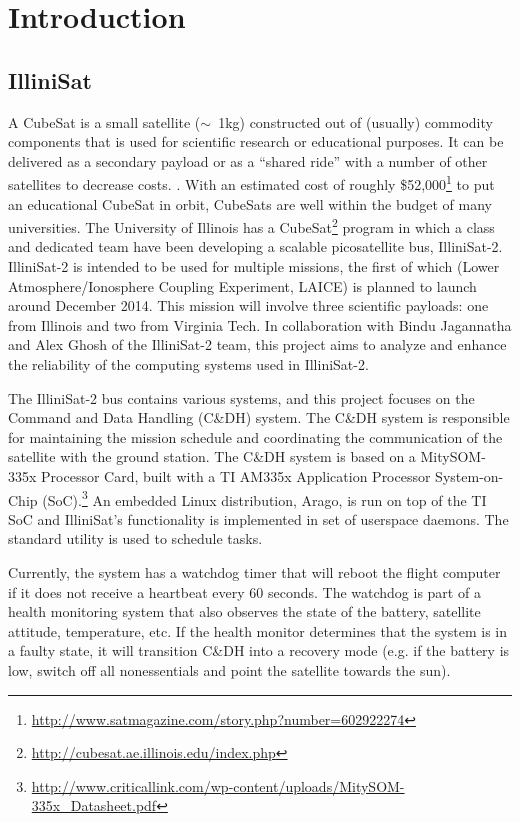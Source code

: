 \section{Introduction}
\subsection{IlliniSat}
A CubeSat is a small satellite ($\sim$~1kg) constructed out of (usually) commodity components
that is used for scientific research or educational purposes. It can be delivered as a secondary payload or 
as a ``shared ride'' with a number of other satellites to decrease costs.
\cite{toorian2008cubesat}.  
With an estimated cost of roughly
\$52,000\footnote{\url{http://www.satmagazine.com/story.php?number=602922274}}
to put an educational CubeSat in orbit, CubeSats are well within the budget of
many universities.  The University of Illinois has a
CubeSat\footnote{\url{http://cubesat.ae.illinois.edu/index.php}} program in
which a class and dedicated team have been developing a scalable picosatellite
bus, IlliniSat-2.  IlliniSat-2 is intended to be used for multiple
missions, the first of which (Lower Atmosphere/Ionosphere Coupling Experiment,
LAICE) is planned to launch around December 2014.  This mission will involve
three scientific payloads: one from Illinois and two from Virginia Tech.  In
collaboration with Bindu Jagannatha and Alex Ghosh of the IlliniSat-2 team, this
project aims to analyze and enhance the reliability of the computing systems
used in IlliniSat-2.

The IlliniSat-2 bus contains various systems, and this project focuses on the
Command and Data Handling (C\&DH) system.  The C\&DH system is responsible
for maintaining the mission schedule and coordinating the communication of the
satellite with the ground station.  The C\&DH system is based on a MitySOM-335x
Processor Card, built with a TI AM335x Application Processor System-on-Chip
(SoC).\footnote{\url{http://www.criticallink.com/wp-content/uploads/MitySOM-335x_Datasheet.pdf}}
An embedded Linux distribution, Arago, is run on top of the TI SoC and
IlliniSat's functionality is implemented in set of userspace daemons. The
standard  utility is used to schedule tasks.

Currently, the system has a watchdog timer that will reboot the flight computer
if it does not receive a heartbeat every 60 seconds.  The watchdog is part of a
health monitoring system that also observes the state of the battery, satellite 
attitude, temperature, etc. If the health monitor determines that the system
is in a faulty state, it will transition C\&DH into a recovery mode (e.g. if the
battery is low, switch off all nonessentials and point the satellite towards the
sun).

